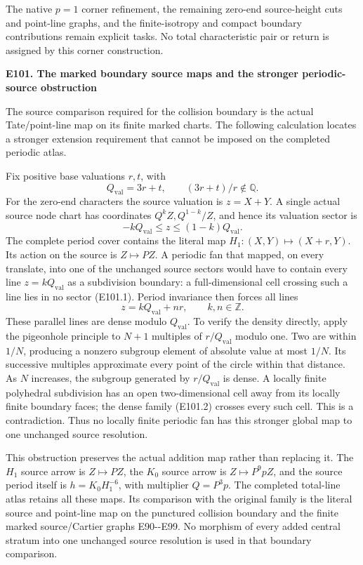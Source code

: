 The native \(p=1\) corner refinement, the remaining zero-end source-height cuts and point-line graphs, and the finite-isotropy and compact boundary contributions remain explicit tasks. No total characteristic pair or return is assigned by this corner construction.

\par

\medskip\noindent\textbf{E101. The marked boundary source maps and the stronger periodic-source obstruction}

\par\nobreak

The source comparison required for the collision boundary is the actual Tate/point-line map on its finite marked charts. The following calculation locates a stronger extension requirement that cannot be imposed on the completed periodic atlas.

Fix positive base valuations \(r,t\), with
\[
 Q_{\mathrm{val}}=3r+t,\qquad (3r+t)/r\notin\mathbb Q.
\]
For the zero-end characters the source valuation is \(z=X+Y\). A single actual source node chart has coordinates \(Q^kZ,Q^{1-k}/Z\), and hence its valuation sector is
\[
             -kQ_{\mathrm{val}}\le z\le(1-k)Q_{\mathrm{val}}.
 \tag{E101.1}
\]
The complete period cover contains the literal map
\(H_1:(X,Y)\mapsto(X+r,Y)\). Its action on the source is \(Z\mapsto PZ\). A periodic fan that mapped, on every translate, into one of the unchanged source sectors would have to contain every line \(z=kQ_{\mathrm{val}}\) as a subdivision boundary: a full-dimensional cell crossing such a line lies in no sector (E101.1). Period invariance then forces all lines
\[
                z=kQ_{\mathrm{val}}+nr,\qquad k,n\in\mathbb Z.
 \tag{E101.2}
\]
These parallel lines are dense modulo \(Q_{\mathrm{val}}\). To verify the density directly, apply the pigeonhole principle to \(N+1\) multiples of \(r/Q_{\mathrm{val}}\) modulo one. Two are within \(1/N\), producing a nonzero subgroup element of absolute value at most \(1/N\). Its successive multiples approximate every point of the circle within that distance. As \(N\) increases, the subgroup generated by \(r/Q_{\mathrm{val}}\) is dense. A locally finite polyhedral subdivision has an open two-dimensional cell away from its locally finite boundary faces; the dense family (E101.2) crosses every such cell. This is a contradiction. Thus no locally finite periodic fan has this stronger global map to one unchanged source resolution.

This obstruction preserves the actual addition map rather than replacing it. The \(H_1\) source arrow is \(Z\mapsto PZ\), the \(K_0\) source arrow is \(Z\mapsto P^9pZ\), and the source period itself is \(h=K_0H_1^{-6}\), with multiplier \(Q=P^3p\). The completed total-line atlas retains all these maps. Its comparison with the original family is the literal source and point-line map on the punctured collision boundary and the finite marked source/Cartier graphs E90-\/-E99. No morphism of every added central stratum into one unchanged source resolution is used in that boundary comparison.

